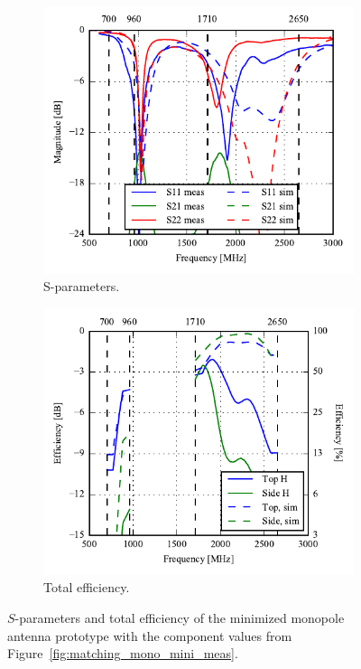 \begin{figure}[htbp]
    \centering
    \begin{subfigure}{0.49\linewidth}
        \includegraphics{img/tech_sol/monopole/5mm/sparams_comp.pdf}
        \caption{S-parameters.}
    \end{subfigure}
    \hfill
    \begin{subfigure}{0.49\linewidth}
        \includegraphics{img/tech_sol/monopole/5mm/eff_comp.pdf}
        \caption{Total efficiency.}
    \end{subfigure}
    \caption{$S$-parameters and total efficiency of the minimized monopole antenna prototype with the component values from Figure~\ref{fig:matching_mono_mini_meas}.}
    \label{fig:mono_proto_sparam_eff5}
\end{figure}

